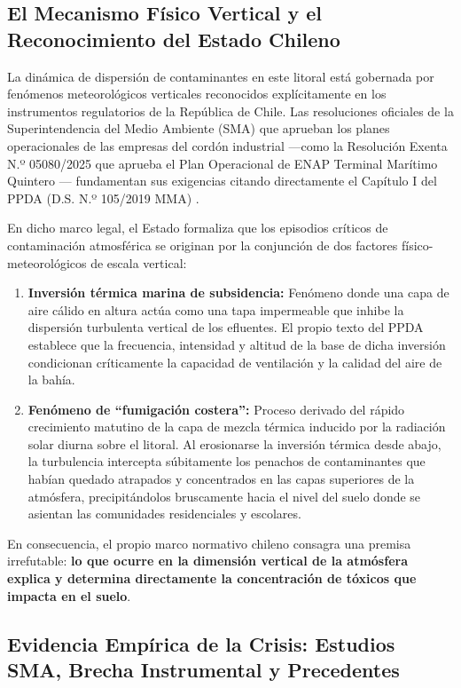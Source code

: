 \documentclass[letterpaper,12pt]{article}
\begin{document}
\subsection{El Mecanismo Físico Vertical y el Reconocimiento del Estado Chileno}
\label{subsec:mecanismo_vertical}

La dinámica de dispersión de contaminantes en este litoral está gobernada por fenómenos meteorológicos verticales reconocidos explícitamente en los instrumentos regulatorios de la República de Chile. Las resoluciones oficiales de la Superintendencia del Medio Ambiente (SMA) que aprueban los planes operacionales de las empresas del cordón industrial —como la Resolución Exenta N.º 05080/2025 que aprueba el Plan Operacional de ENAP Terminal Marítimo Quintero \cite{sma_enap}— fundamentan sus exigencias citando directamente el Capítulo I del PPDA (D.S. N.º 105/2019 MMA) \cite{ppda_concon}.

En dicho marco legal, el Estado formaliza que los episodios críticos de contaminación atmosférica se originan por la conjunción de dos factores físico-meteorológicos de escala vertical:
\begin{enumerate}
    \item \textbf{Inversión térmica marina de subsidencia:} Fenómeno donde una capa de aire cálido en altura actúa como una tapa impermeable que inhibe la dispersión turbulenta vertical de los efluentes. El propio texto del PPDA establece que la frecuencia, intensidad y altitud de la base de dicha inversión condicionan críticamente la capacidad de ventilación y la calidad del aire de la bahía.
    \item \textbf{Fenómeno de ``fumigación costera'':} Proceso derivado del rápido crecimiento matutino de la capa de mezcla térmica inducido por la radiación solar diurna sobre el litoral. Al erosionarse la inversión térmica desde abajo, la turbulencia intercepta súbitamente los penachos de contaminantes que habían quedado atrapados y concentrados en las capas superiores de la atmósfera, precipitándolos bruscamente hacia el nivel del suelo donde se asientan las comunidades residenciales y escolares.
\end{enumerate}

En consecuencia, el propio marco normativo chileno consagra una premisa irrefutable: \textbf{lo que ocurre en la dimensión vertical de la atmósfera explica y determina directamente la concentración de tóxicos que impacta en el suelo}.

\subsection{Evidencia Empírica de la Crisis: Estudios SMA, Brecha Instrumental y Precedentes}
\label{subsec:evidencia_empirica}
\end{document}
